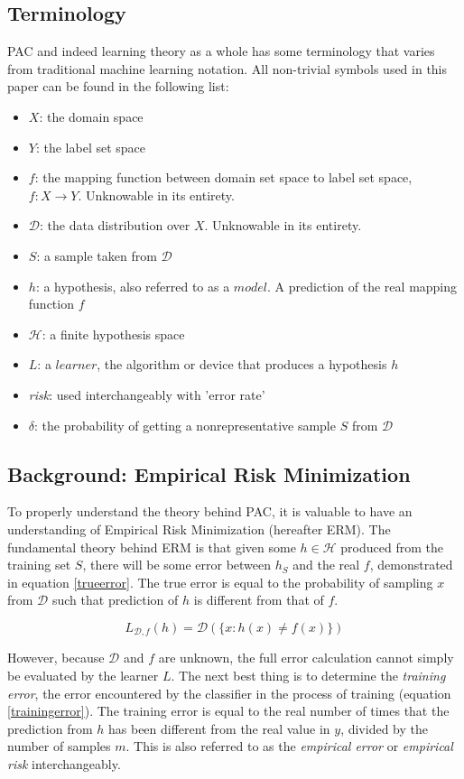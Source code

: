 \documentclass[10pt,conference]{IEEEtran}
\def\dist{\mathcal{D}}
\def\hypspace{\mathcal{H}}
\begin{document}
  \subsection{Terminology}
  PAC and indeed learning theory as a whole has some terminology that varies from traditional machine learning notation. All non-trivial symbols used in this paper can be found in the following list:
  \begin{itemize}
    \item $X$: the domain space
    \item $Y$: the label set space
    \item $f$: the mapping function between domain set space to label set space, $f: X \rightarrow Y$. Unknowable in its entirety.
    \item $\dist$: the data distribution over $X$. Unknowable in its entirety.
    \item $S$: a sample taken from $\dist$
    \item $h$: a hypothesis, also referred to as a $model$. A prediction of the real mapping function $f$
    \item $\hypspace$: a finite hypothesis space
    \item $L$: a $learner$, the algorithm or device that produces a hypothesis $h$
    \item \emph{risk}: used interchangeably with 'error rate'
    \item $\delta$: the probability of getting a nonrepresentative sample $S$ from $\dist$
  \end{itemize} 
  \subsection{Background: Empirical Risk Minimization}
  To properly understand the theory behind PAC, it is valuable to have an understanding of Empirical Risk Minimization (hereafter ERM). The fundamental theory behind ERM is that given some $h \in \hypspace$ produced from the training set $S$, there will be some error between $h_S$ and the real $f$, demonstrated in equation \ref{trueerror}. The true error is equal to the probability of sampling $x$ from $\dist$ such that prediction of $h$ is different from that of $f$\cite{shais}.

  \begin{equation}
    \label{trueerror}
    L_{\dist, f}(h) = \dist(\{x : h(x) \neq f(x)\})
  \end{equation}

  However, because $\dist$ and $f$ are unknown, the full error calculation cannot simply be evaluated by the learner $L$\cite{shais}. The next best thing is to determine the \emph{training error}, the error encountered by the classifier in the process of training (equation \ref{trainingerror})\cite{shais}. The training error is equal to the real number of times that the prediction from $h$ has been different from the real value in $y$, divided by the number of samples $m$. This is also referred to as the \emph{empirical error} or \emph{empirical risk} interchangeably\cite{shais}.
\end{document}
